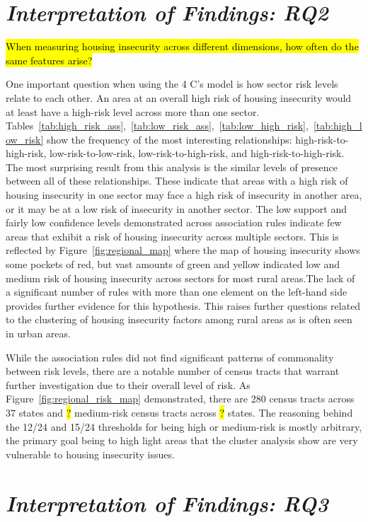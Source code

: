 \section{\textit{Interpretation of Findings: RQ2}}

\hl{When measuring housing insecurity across different dimensions, how often do the same features arise?}

One important question when using the 4 C's model is how sector risk levels relate to each other. An area at an overall high risk of housing insecurity would at least have a high-risk level across more than one sector. Tables~\ref{tab:high_risk_ass},~\ref{tab:low_risk_ass},~\ref{tab:low_high_risk},~\ref{tab:high_low_risk} show the frequency of the most interesting relationships: high-risk-to-high-risk, low-risk-to-low-risk, low-risk-to-high-risk, and high-risk-to-high-risk. The most surprising result from this analysis is the similar levels of presence between all of these relationships. These indicate that areas with a high risk of housing insecurity in one sector may face a high risk of insecurity in another area, or it may be at a low risk of insecurity in another sector. The low support and fairly low confidence levels demonstrated across association rules indicate few areas that exhibit a risk of housing insecurity across multiple sectors. This is reflected by Figure~\ref{fig:regional_map} where the map of housing insecurity shows some pockets of red, but vast amounts of green and yellow indicated low and medium risk of housing insecurity across sectors for most rural areas.The lack of a significant number of rules with more than one element on the left-hand side provides further evidence for this hypothesis. This raises further questions related to the clustering of housing insecurity factors among rural areas as is often seen in urban areas. 

While the association rules did not find significant patterns of commonality between risk levels, there are a notable number of census tracts that warrant further investigation due to their overall level of risk. As Figure~\ref{fig:regional_risk_map} demonstrated, there are 280 census tracts across 37 states and \hl{?} medium-risk census tracts across \hl{?} states. The reasoning behind the 12/24 and 15/24 thresholds for being high or medium-risk is mostly arbitrary, the primary goal being to high light areas that the cluster analysis show are very vulnerable to housing insecurity issues. 

\section{\textit{Interpretation of Findings: RQ3}}

